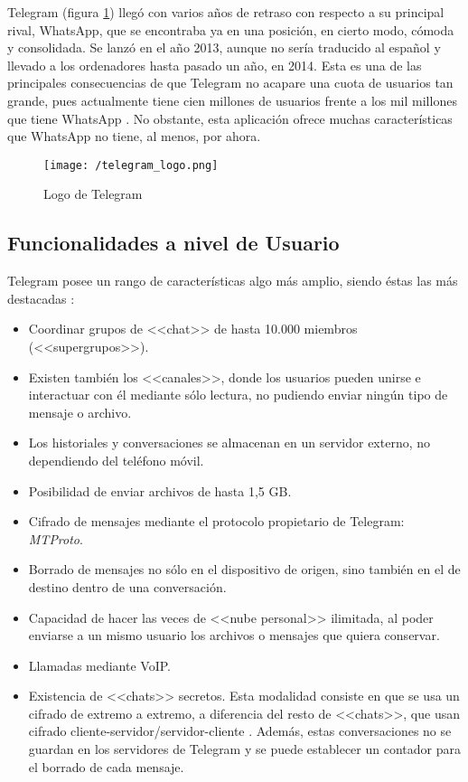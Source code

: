 Telegram (figura \ref{fig:telegram}) llegó con varios años de retraso con respecto a su principal rival, WhatsApp, que se encontraba ya en una posición, en cierto modo, cómoda y consolidada. Se lanzó en el año 2013, aunque no sería traducido al español y llevado a los ordenadores hasta pasado un año, en 2014. Esta es una de las principales consecuencias de que Telegram no acapare una cuota de usuarios tan grande, pues actualmente tiene cien millones de usuarios frente a los mil millones que tiene WhatsApp \cite{Ramirez2017}. No obstante, esta aplicación ofrece muchas características que WhatsApp no tiene, al menos, por ahora.

\begin{figure}[!h]
	\begin{center}
		\texttt{[image: /telegram\_logo.png]}
		\caption{Logo de Telegram}
		\label{fig:telegram}
	\end{center}
\end{figure}

\subsection{Funcionalidades a nivel de Usuario}
Telegram posee un rango de características algo más amplio, siendo éstas las más destacadas \cite{Telegram2017}:

\begin{itemize}
	\item Coordinar grupos de <<chat>> de hasta 10.000 miembros (<<supergrupos>>).
	\item Existen también los <<canales>>, donde los usuarios pueden unirse e interactuar con él mediante sólo lectura, no pudiendo enviar ningún tipo de mensaje o archivo.
	\item Los historiales y conversaciones se almacenan en un servidor externo, no dependiendo del teléfono móvil.
	\item Posibilidad de enviar archivos de hasta 1,5 \acs{GB}.
	\item Cifrado de mensajes mediante el protocolo propietario de Telegram: \textit{MTProto}.
	\item Borrado de mensajes no sólo en el dispositivo de origen, sino también en el de destino dentro de una conversación.
	\item Capacidad de hacer las veces de <<nube personal>> ilimitada, al poder enviarse a un mismo usuario los archivos o mensajes que quiera conservar.
	\item Llamadas mediante \acs{VoIP}.
	\item Existencia de <<chats>> secretos. Esta modalidad consiste en que se usa un cifrado de extremo a extremo, a diferencia del resto de <<chats>>, que usan cifrado cliente-servidor/servidor-cliente \cite{Telegram2017a}. Además, estas conversaciones no se guardan en los servidores de Telegram y se puede establecer un contador para el borrado de cada mensaje.
\end{itemize}

